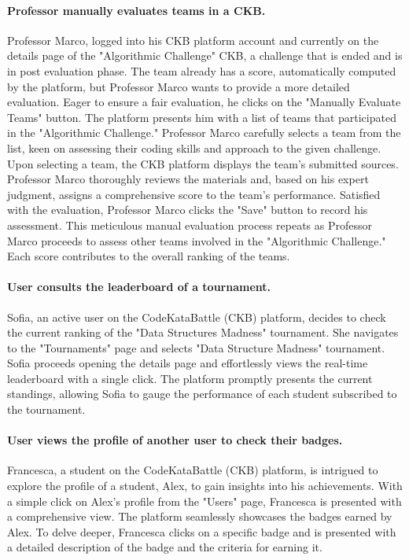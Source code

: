 \paragraph*{Professor manually evaluates teams in a CKB.}
Professor Marco, logged into his CKB platform account and currently on the details page of the "Algorithmic Challenge" CKB, a challenge that is ended and is in post evaluation phase.
The team already has a score, automatically computed by the platform, but Professor Marco wants to provide a more detailed evaluation. 
Eager to ensure a fair evaluation, he clicks on the "Manually Evaluate Teams" button.
The platform presents him with a list of teams that participated in the "Algorithmic Challenge." 
Professor Marco carefully selects a team from the list, keen on assessing their coding skills and approach to the given challenge.
Upon selecting a team, the CKB platform displays the team's submitted sources. 
Professor Marco thoroughly reviews the materials and, based on his expert judgment, assigns a comprehensive score to the team's performance.
Satisfied with the evaluation, Professor Marco clicks the "Save" button to record his assessment. 
This meticulous manual evaluation process repeats as Professor Marco proceeds to assess other teams involved in the "Algorithmic Challenge." 
Each score contributes to the overall ranking of the teams.

\paragraph*{User consults the leaderboard of a tournament.}
Sofia, an active user on the CodeKataBattle (CKB) platform, decides to check the current ranking of the "Data Structures Madness" tournament. 
She navigates to the "Tournaments" page and selects "Data Structure Madness" tournament.
Sofia proceeds opening the details page and effortlessly views the real-time leaderboard with a single click. 
The platform promptly presents the current standings, allowing Sofia to gauge the performance of each student subscribed to the tournament.

\paragraph*{User views the profile of another user to check their badges.}
Francesca, a student on the CodeKataBattle (CKB) platform, is intrigued to explore the profile of a student, Alex, to gain insights into his achievements. 
With a simple click on Alex's profile from the "Users" page, Francesca is presented with a comprehensive view. 
The platform seamlessly showcases the badges earned by Alex. 
To delve deeper, Francesca clicks on a specific badge and is presented with a detailed description of the badge and the criteria for earning it.

